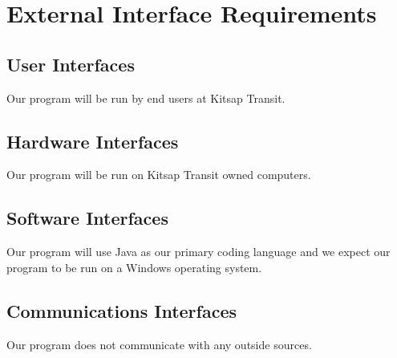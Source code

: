 \section{External Interface Requirements}

\subsection{User Interfaces}
Our program will be run by end users at Kitsap Transit.

\subsection{Hardware Interfaces}
Our program will be run on Kitsap Transit owned computers.

\subsection{Software Interfaces}
Our program will use Java as our primary coding language and we expect our program to be run on a Windows operating system.

\subsection{Communications Interfaces}
Our program does not communicate with any outside sources.